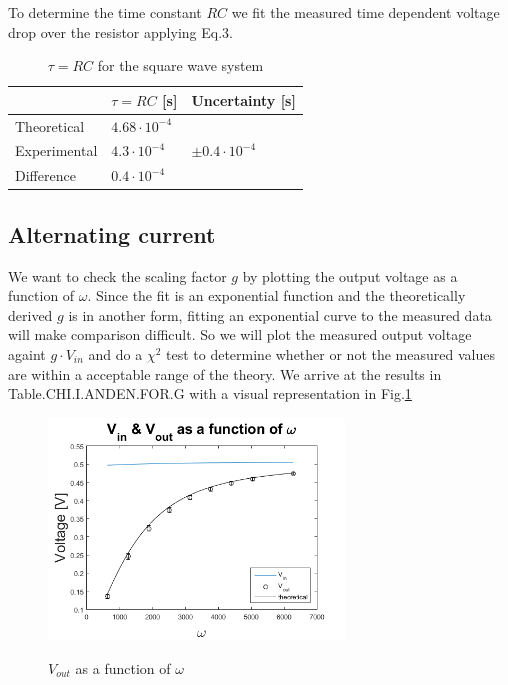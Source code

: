 \documentclass[../main/main.tex]{subfiles}
\begin{document}
To determine the time constant \( RC \) we fit the measured time dependent voltage drop over the resistor applying Eq.3.

\begin{table}[]
\centering
\caption{\( \tau = RC \) for the square wave system}
\label{data_square}
\begin{tabular}{|l|l|l|}
\hline
             & \( \tau = RC\) [s]       & Uncertainty [s]                         \\ \hline
Theoretical  & \( 4.68 \cdot 10^{-4} \) &                                         \\ \hline
Experimental & \( 4.3 \cdot 10^{-4} \)  & \( \pm 0.4 \cdot 10^{-4} \)             \\ \hline
Difference   & \( 0.4 \cdot 10^{-4} \)  &                                         \\ \hline
\end{tabular}
\end{table}

\subsection*{Alternating current}

We want to check the scaling factor \( g \) by plotting the output voltage as a function of \( \omega \).
Since the fit is an exponential function and the theoretically derived \( g \) is in another form, fitting an exponential curve to the measured data will make comparison difficult. So  we will plot the measured output voltage againt \( g \cdot V_{in} \) and do a \( \chi^2 \) test to determine whether or not the measured values are within a acceptable range of the theory.
We arrive at the results in Table.CHI.I.ANDEN.FOR.G with a visual representation in Fig.\ref{fig:VinVudafphi}

\begin{figure}[!ht]
  \caption{ \( V_{out} \) as a function of \( \omega \) }
  \centering
    \includegraphics[width=0.7\textwidth]{../img/VinVudafphi.png}
    \label{fig:VinVudafphi}
\end{figure}
\end{document}
